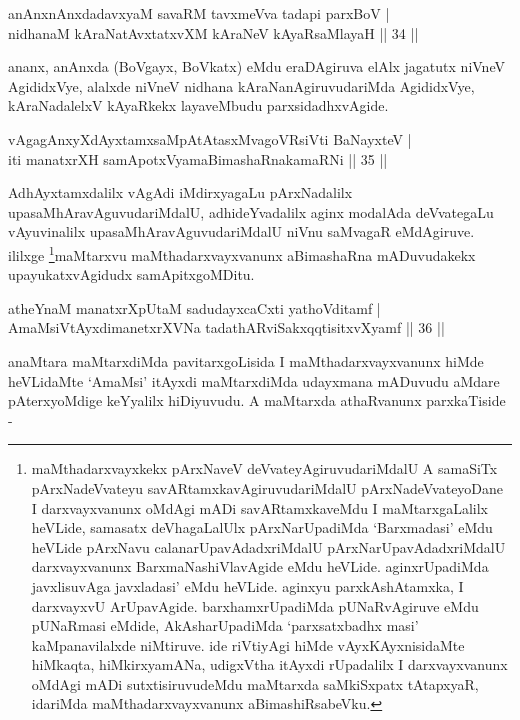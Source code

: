 \begin{shl}
anAnxnAnxdadavxyaM savaRM tavxmeVva tadapi parxBoV | \\
nidhanaM kAraNatAvxtatxvXM kAraNeV kAyaRsaMlayaH \hfill|| 34 || 
\end{shl}

\begin{artha}
ananx, anAnxda (BoVgayx, BoVkatx) eMdu eraDAgiruva elAlx jagatutx niVneV AgididxVye, alalxde niVneV nidhana kAraNanAgiruvudariMda AgididxVye, kAraNadalelxV kAyaRkekx layaveMbudu parxsidadhxvAgide.
\end{artha}

\begin{shl}
vAgagAnxyXdAyxtamxsaMpAtAtasxMvagoVR\s siVti BaNayxteV | \\
iti manatxrXH samApotxV\s yamaBimashaRnakamaRNi \hfill|| 35 || 
\end{shl}

\begin{artha}
AdhAyxtamxdalilx vAgAdi iMdirxyagaLu pArxNadalilx upasaMhAravAguvudariMdalU, adhideYvadalilx aginx modalAda deVvategaLu vAyuvinalilx upasaMhAravAguvudariMdalU niVnu saMvagaR eMdAgiruve. ililxge \footnote{maMthadarxvayxkekx pArxNaveV deVvateyAgiruvudariMdalU A samaSiTx pArxNadeVvateyu savARtamxkavAgiruvudariMdalU pArxNadeVvateyoDane I darxvayxvanunx oMdAgi mADi savARtamxkaveMdu I maMtarxgaLalilx heVLide, samasatx deVhagaLalUlx pArxNarUpadiMda `Barxmadasi' eMdu heVLide pArxNavu calanarUpavAdadxriMdalU pArxNarUpavAdadxriMdalU darxvayxvanunx BarxmaNashiVlavAgide eMdu heVLide. aginxrUpadiMda javxlisuvAga javxladasi' eMdu heVLide. aginxyu parxkAshAtamxka, I darxvayxvU ArUpavAgide. barxhamxrUpadiMda pUNaRvAgiruve eMdu pUNaRmasi eMdide, AkAsharUpadiMda `parxsatxbadhx masi' kaMpanavilalxde niMtiruve. ide riVtiyAgi hiMde vAyxKAyxnisidaMte hiMkaqta, hiMkirxyamANa, udigxVtha itAyxdi rUpadalilx I darxvayxvanunx oMdAgi mADi sutxtisiruvudeMdu maMtarxda saMkiSxpatx tAtapxyaR, idariMda maMthadarxvayxvanunx aBimashiRsabeVku.}maMtarxvu maMthadarxvayxvanunx aBimashaRna mADuvudakekx upayukatxvAgidudx samApitxgoMDitu.
\end{artha}


\begin{shl}
atheYnaM manatxrXpUtaM sadudayxcaCxti yathoVditamf | \\
AmaMsiVtAyxdimanetxrXVNa tadathARviSakxqqtisitxvXyamf \hfill|| 36 || 
\end{shl}

\begin{artha}
anaMtara maMtarxdiMda pavitarxgoLisida I maMthadarxvayxvanunx hiMde heVLidaMte `AmaMsi' itAyxdi maMtarxdiMda udayxmana mADuvudu aMdare pAterxyoMdige keYyalilx hiDiyuvudu. A maMtarxda athaRvanunx parxkaTiside - 
\end{artha}

